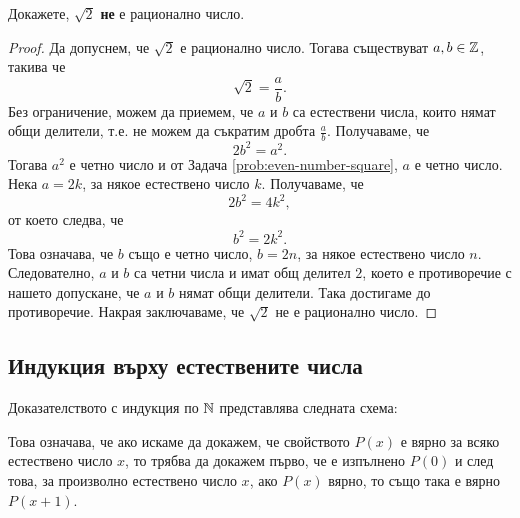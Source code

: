 \begin{problem}
  Докажете, $\sqrt{2}$ {\bf не} е рационално число.
\end{problem}
\begin{proof}
  Да допуснем, че $\sqrt{2}$ е рационално число. Тогава  съществуват $a,b \in \Int$, такива че
  \[\sqrt{2} = \frac{a}{b}.\]
  Без ограничение, можем да приемем, че $a$ и $b$ са естествени числа,
  които нямат общи делители, т.е. не можем да съкратим дробта $\frac{a}{b}$.
  Получаваме, че \[2b^2 = a^2.\]
  Тогава $a^2$ е четно число и от Задача \ref{prob:even-number-square}, $a$ е четно число.
  Нека $a = 2k$, за някое естествено число $k$. Получаваме, че
  \[2b^2 = 4k^2,\]
  от което следва, че
  \[b^2 = 2k^2.\]
  Това означава, че $b$ също е четно число, $b = 2n$, за някое естествено число $n$.
  Следователно, $a$ и $b$ са четни числа и имат общ делител $2$,
  което е противоречие с нашето допускане, че $a$ и $b$ нямат общи делители.
  Така достигаме до противоречие.
  Накрая заключаваме, че $\sqrt{2}$ не е рационално число.
\end{proof}


\subsection*{Индукция върху естествените числа}

Доказателството с индукция по $\Nat$ представлява следната схема:
\begin{prooftree}
\end{prooftree}

Това означава, че ако искаме да докажем, че свойството $P(x)$ е вярно за всяко естествено число $x$,
то трябва да докажем първо, че е изпълнено $P(0)$ и след това, за произволно естествено число $x$, ако $P(x)$ вярно, то също така е вярно $P(x+1)$.


